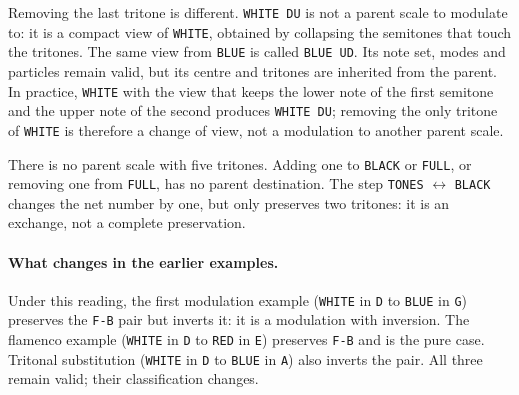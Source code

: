 \documentclass[]{report}
\begin{document}
Removing the last tritone is different. \texttt{WHITE DU} is not a parent scale
to modulate to: it is a compact view of \texttt{WHITE}, obtained by collapsing
the semitones that touch the tritones. The same view from \texttt{BLUE} is called
\texttt{BLUE UD}. Its note set, modes and particles remain valid, but its centre
and tritones are inherited from the parent. In practice, \texttt{WHITE} with the
view that keeps the lower note of the first semitone and the upper note of the
second produces \texttt{WHITE DU}; removing the only tritone of \texttt{WHITE}
is therefore a change of view, not a modulation to another parent scale.

There is no parent scale with five tritones. Adding one to \texttt{BLACK} or
\texttt{FULL}, or removing one from \texttt{FULL}, has no parent destination.
The step \texttt{TONES} $\leftrightarrow$ \texttt{BLACK} changes the net number
by one, but only preserves two tritones: it is an exchange, not a complete
preservation.

\paragraph{What changes in the earlier examples.}
Under this reading, the first modulation example (\texttt{WHITE} in \texttt{D}
to \texttt{BLUE} in \texttt{G}) preserves the \texttt{F-B} pair but inverts it:
it is a modulation with inversion. The flamenco example (\texttt{WHITE} in
\texttt{D} to \texttt{RED} in \texttt{E}) preserves \texttt{F-B} and is the pure
case. Tritonal substitution (\texttt{WHITE} in \texttt{D} to \texttt{BLUE} in
\texttt{A}) also inverts the pair. All three remain valid; their classification
changes.
\end{document}
